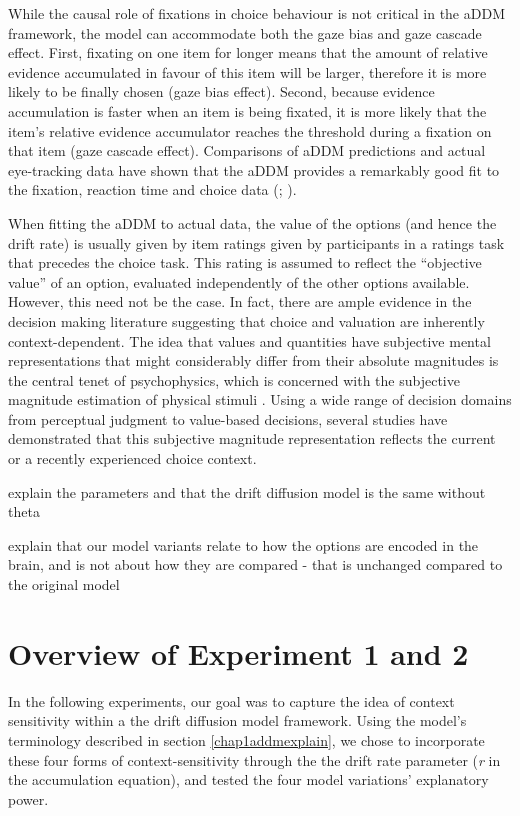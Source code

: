 \documentclass[11pt,a4paper]{article}
\begin{document}
While the causal role of fixations in choice behaviour is not critical in the aDDM framework, the model can accommodate both the gaze bias and gaze cascade effect. First, fixating on one item for longer means that the amount of relative evidence accumulated in favour of this item will be larger, therefore it is more likely to be finally chosen (gaze bias effect). Second, because evidence accumulation is faster when an item is being fixated, it is more likely that the item's relative evidence accumulator reaches the threshold during a fixation on that item (gaze cascade effect). Comparisons of aDDM predictions and actual eye-tracking data have shown that the aDDM provides a remarkably good fit to the fixation, reaction time and choice data (; ).

When fitting the aDDM to actual data, the value of the options (and hence the drift rate) is usually given by item ratings given by participants in a ratings task that precedes the choice task. This rating is assumed to reflect the “objective value” of an option, evaluated independently of the other options available. However, this need not be the case. In fact, there are ample evidence in the decision making literature suggesting that choice and valuation are inherently context-dependent. The idea that values and quantities have subjective mental representations that might considerably differ from their absolute magnitudes is the central tenet of psychophysics, which is concerned with the subjective magnitude estimation of physical stimuli \cite{Stevens1957}. Using a wide range of decision domains from perceptual judgment to value-based decisions, several studies have demonstrated that this subjective magnitude representation reflects the current or a recently experienced choice context. 


explain the parameters and that the drift diffusion model is the same without theta

explain that our model variants relate to how the options are encoded in the brain, and is not about how they are compared - that is unchanged compared to the original model


\section{Overview of Experiment 1 and 2}

In the following experiments, our goal was to capture the idea of context sensitivity within a the drift diffusion model framework. Using the model's terminology described in section \ref{chap1addmexplain}, we chose to incorporate these four forms of context-sensitivity through the the drift rate parameter (\textit{r} in the accumulation equation), and tested the four model variations' explanatory power.
\end{document}
